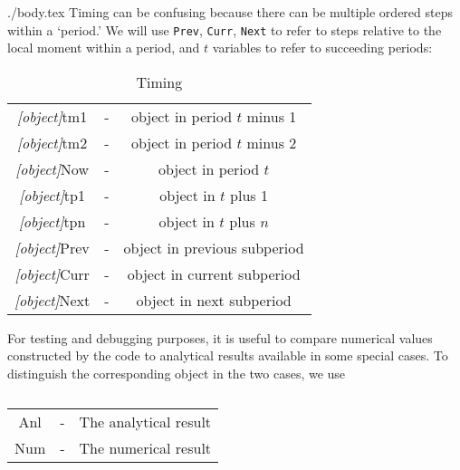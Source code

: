 \documentclass[12pt]{econtex}
\begin{document}
\begin{verbatimwrite}{./body.tex}
Timing can be confusing because there can be multiple ordered steps 
within a `period.'  We will use \texttt{Prev}, \texttt{Curr}, \texttt{Next} to refer
to steps relative to the local moment within a period, and $t$ variables to refer to succeeding periods:
\begin{table}[h]
	\centering 
	\begin{tabular}{||>{\ttfamily}ccc||} 		
		\hline
   \textit{[object]}tm1 & - & object in period $t$ minus 1 
\\ \textit{[object]}tm2 & - & object in period $t$ minus 2 
\\ \textit{[object]}Now & - & object in period $t$
\\ \textit{[object]}tp1 & - & object in $t$ plus 1 
\\ \textit{[object]}tpn & - & object in $t$ plus $n$ 
\\ \textit{[object]}Prev & - & object in previous subperiod
\\ \textit{[object]}Curr & - & object in current subperiod
\\ \textit{[object]}Next & - & object in next subperiod
\\	\hline
	\end{tabular}
	\caption{Timing}
	\label{table:Timing}
\end{table}	

For testing and debugging purposes, it is useful to compare numerical 
values constructed by the code to analytical results available in some
special cases.  To distinguish the corresponding object in the two cases,
we use
\begin{table}[h]
	\centering
	\begin{tabular}{||>{\ttfamily}ccc||} 		
		\hline
Anl & - & The analytical result
\\ Num & - & The numerical result 
\\ \hline
	\end{tabular}
	\caption{}
	\label{table:AnlVsNum}
\end{table}


\end{verbatimwrite}

\end{document}
